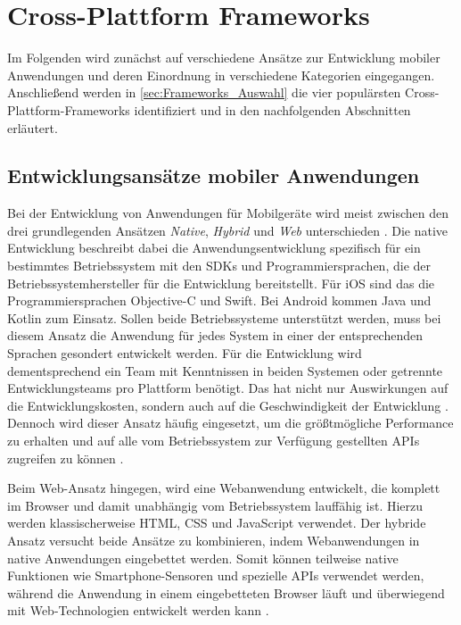 \chapter{Cross-Plattform Frameworks}
\label{ch:Frameworks}

Im Folgenden wird zunächst auf verschiedene Ansätze zur Entwicklung mobiler Anwendungen und deren Einordnung in verschiedene Kategorien eingegangen.
Anschließend werden in \autoref{sec:Frameworks_Auswahl} die vier populärsten Cross-Plattform-Frameworks identifiziert und in den nachfolgenden Abschnitten erläutert.

\section{Entwicklungsansätze mobiler Anwendungen}
\label{sec:Entwicklungsansaetze}
Bei der Entwicklung von Anwendungen für Mobilgeräte wird meist zwischen den drei grundlegenden Ansätzen \textit{Native}, \textit{Hybrid} und \textit{Web} unterschieden \cite{Nunkesser_Taxonomy_Apps, Que_Comparison_Hybrid_Native}.
Die native Entwicklung beschreibt dabei die Anwendungsentwicklung spezifisch für ein bestimmtes Betriebssystem mit den \acp{SDK} und Programmiersprachen, die der Betriebssystemhersteller für die Entwicklung bereitstellt.
Für iOS sind das die Programmiersprachen Objective-C und Swift.
Bei Android kommen Java und Kotlin zum Einsatz.
Sollen beide Betriebssysteme unterstützt werden, muss bei diesem Ansatz die Anwendung für jedes System in einer der entsprechenden Sprachen gesondert entwickelt werden.
Für die Entwicklung wird dementsprechend ein Team mit Kenntnissen in beiden Systemen oder getrennte Entwicklungsteams pro Plattform benötigt.
Das hat nicht nur Auswirkungen auf die Entwicklungskosten, sondern auch auf die Geschwindigkeit der Entwicklung \cite{Manchanda_CrossPlatformFrameworks}.
Dennoch wird dieser Ansatz häufig eingesetzt, um die größtmögliche Performance zu erhalten und auf alle vom Betriebssystem zur Verfügung gestellten \acp{API} zugreifen zu können \cite{Pinto_Native_to_Cross_Platform}.

Beim Web-Ansatz hingegen, wird eine Webanwendung entwickelt, die komplett im Browser und damit unabhängig vom Betriebssystem lauffähig ist.
Hierzu werden klassischerweise \ac{HTML}, \ac{CSS} und JavaScript verwendet.
Der hybride Ansatz versucht beide Ansätze zu kombinieren, indem Webanwendungen in native Anwendungen eingebettet werden.
Somit können teilweise native Funktionen wie Smartphone-Sensoren und spezielle \acp{API} verwendet werden, während die Anwendung in einem eingebetteten Browser läuft und überwiegend mit Web-Technologien entwickelt werden kann \cite{Nunkesser_Taxonomy_Apps}.

